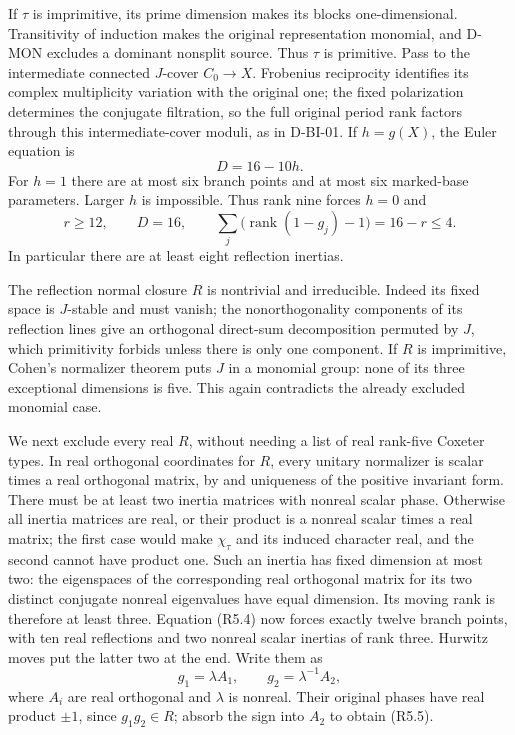 If $\tau$ is imprimitive, its prime dimension makes its blocks
one-dimensional.  Transitivity of induction makes the original
representation monomial, and D-MON excludes a dominant nonsplit
source.  Thus $\tau$ is primitive.
Pass to the intermediate connected $J$-cover $C_0\to X$.
Frobenius reciprocity identifies its complex multiplicity variation
with the original one; the fixed polarization determines the
conjugate filtration, so the full original period rank factors
through this intermediate-cover moduli, as in D-BI-01.
If $h=g(X)$, the Euler equation is
\[
                            D=16-10h.
\]
For $h=1$ there are at most six branch points and at most six
marked-base parameters.  Larger $h$ is impossible.  Thus rank nine
forces $h=0$ and
\[
 r\ge12,\qquad D=16,\qquad
                  \sum_j\bigl(\operatorname{rank}(1-g_j)-1\bigr)
                       =16-r\le4.                           \tag{R5.4}
\]
In particular there are at least eight reflection inertias.

The reflection normal closure $R$ is nontrivial and irreducible.
Indeed its fixed space is $J$-stable and must vanish; the
nonorthogonality components of its reflection lines give an
orthogonal direct-sum decomposition permuted by $J$, which
primitivity forbids unless there is only one component.
If $R$ is imprimitive, Cohen's normalizer theorem
\cite[Proposition~2.13 and its proof, pp.~391--392]{FIELD:Cohen}
puts $J$ in a monomial group: none of its three exceptional
dimensions is five.  This again contradicts the already excluded
monomial case.

We next exclude every real $R$, without needing a list of real
rank-five Coxeter types.  In real orthogonal coordinates for $R$,
every unitary normalizer is scalar times a real orthogonal matrix,
by \cite[Lemma~2.12 and its proof, p.~391]{FIELD:Cohen} and
uniqueness of the positive invariant form.
There must be at least two inertia matrices with nonreal scalar
phase.  Otherwise all inertia matrices are real, or their
product is a nonreal scalar times a real matrix; the first case
would make $\chi_\tau$ and its induced character real, and the
second cannot have product one.
Such an inertia has fixed dimension at most two: the eigenspaces
of the corresponding real orthogonal matrix for its two distinct
conjugate nonreal eigenvalues have equal dimension.
Its moving rank is therefore at least three.
Equation (R5.4) now forces exactly twelve branch points, with ten
real reflections and two nonreal scalar inertias of rank three.
Hurwitz moves put the latter two at the end.  Write them as
\[
                 g_1=\lambda A_1,
                 \qquad g_2=\lambda^{-1}A_2,
                                                               \tag{R5.5}
\]
where $A_i$ are real orthogonal and $\lambda$ is nonreal.
Their original phases have real product $\pm1$, since
$g_1g_2\in R$; absorb the sign into $A_2$ to obtain (R5.5).

